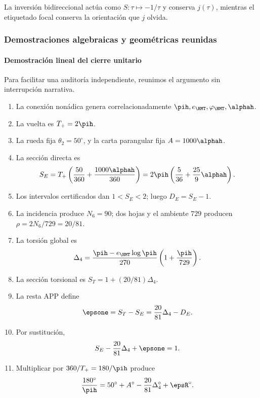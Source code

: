 \begin{theorem}[Modularidad]
La inversión bidireccional actúa como \(S:\tau\mapsto-1/\tau\) y conserva
\(j(\tau)\), mientras el etiquetado focal conserva la orientación que
\(j\) olvida.
\end{theorem}

\subsubsection{Demostraciones algebraicas y geométricas reunidas}

\paragraph{Demostración lineal del cierre unitario}

Para facilitar una auditoría independiente, reunimos el argumento sin
interrupción narrativa.

\begin{enumerate}[label=\textbf{Paso \arabic*.},leftmargin=2.2cm]
\item La conexión nonádica genera correlacionadamente
\(\pih,e_{\HMT},\varphi_{\HMT},\alphah\).
\item La vuelta es \(T_+=2\pih\).
\item La rueda fija \(\theta_2=50^\circ\), y la carta parangular fija
\(A=1000\alphah\).
\item La sección directa es
\[
S_E=T_+\left(\frac{50}{360}+\frac{1000\alphah}{360}\right)
=2\pih\left(\frac5{36}+\frac{25}{9}\alphah\right).
\]
\item Los intervalos certificados dan \(1<S_E<2\); luego
\(D_E=S_E-1\).
\item La incidencia produce \(N_6=90\); dos hojas y el ambiente \(729\)
producen \(\rho=2N_6/729=20/81\).
\item La torsión global es
\[
\Delta_4=\frac{\pih-e_{\HMT}\log\pih}{270}
\left(1+\frac{\pih}{729}\right).
\]
\item La sección torsional es \(S_T=1+(20/81)\Delta_4\).
\item La resta APP define
\[
\epsone=S_T-S_E=\frac{20}{81}\Delta_4-D_E.
\]
\item Por sustitución,
\[
S_E-\frac{20}{81}\Delta_4+\epsone=1.
\]
\item Multiplicar por \(360/T_+=180/\pih\) produce
\[
\frac{180^\circ}{\pih}
=50^\circ+A^\circ-\frac{20}{81}\Delta_4^\circ+\epsR^\circ.
\]
\end{enumerate}

